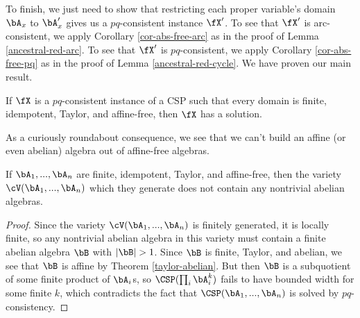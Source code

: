 To finish, we just need to show that restricting each proper variable's domain $\bA_x$ to $\bA_x'$ gives us a $pq$-consistent instance $\fX'$. To see that $\fX'$ is arc-consistent, we apply Corollary \ref{cor-abs-free-arc} as in the proof of Lemma \ref{ancestral-red-arc}. To see that $\fX'$ is $pq$-consistent, we apply Corollary \ref{cor-abs-free-pq} as in the proof of Lemma \ref{ancestral-red-cycle}. We have proven our main result.

\begin{thm}\label{affine-free-pq} If $\fX$ is a $pq$-consistent instance of a CSP such that every domain is finite, idempotent, Taylor, and affine-free, then $\fX$ has a solution.
\end{thm}

\begin{comment}
In fact, we have the following slight strengthening of Kozik's result.

\begin{thm} Suppose that $\fX$ is a $pq$-consistent instance of a CSP such that every domain is finite, idempotent, Taylor, and affine-free. If $x$ is a variable with domain $\bA_x$, then for any element $a \in \bA_x$ such that there is a sequence of subalgebras $\bA_x = \bA_0 \supseteq \cdots \supseteq \bA_n = \{a\}$ such that for each $i$ either $\bA_{i+1}$ is a minimal absorbing subalgebra of $\bA_i$ or $\bA_{i+1}$ is a congruence class of a congruence $\theta \in \Con(\bA_i)$ such that $\bA_i/\theta$ is polynomially complete and $\bA_i$ is absorption free, there is a solution to the instance $\fX$ in which $x$ is assigned the value $a$.
\end{thm}
\end{comment}

As a curiously roundabout consequence, we see that we can't build an affine (or even abelian) algebra out of affine-free algebras.

\begin{cor}\label{affine-free-variety} If $\bA_1, ..., \bA_n$ are finite, idempotent, Taylor, and affine-free, then the variety $\cV(\bA_1, ..., \bA_n)$ which they generate does not contain any nontrivial abelian algebras.
\end{cor}
\begin{proof} Since the variety $\cV(\bA_1, ..., \bA_n)$ is finitely generated, it is locally finite, so any nontrivial abelian algebra in this variety must contain a finite abelian algebra $\bB$ with $|\bB| > 1$. Since $\bB$ is finite, Taylor, and abelian, we see that $\bB$ is affine by Theorem \ref{taylor-abelian}. But then $\bB$ is a subquotient of some finite product of $\bA_i$s, so $\CSP(\prod_i \bA_i^k)$ fails to have bounded width for some finite $k$, which contradicts the fact that $\CSP(\bA_1, ..., \bA_n)$ is solved by $pq$-consistency.
\end{proof}

